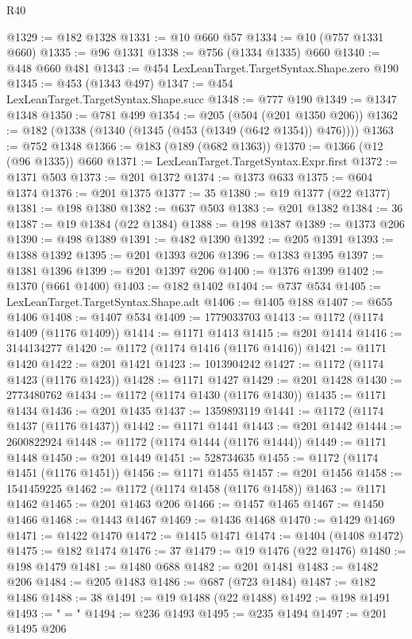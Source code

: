 \begin{lexlean}{R40}
\begin{coremodule}
@1329 := @182 @1328
@1331 := @10 @660 @57
@1334 := @10 (@757 @1331 @660)
@1335 := @96 @1331
@1338 := @756 (@1334 @1335) @660
@1340 := @448 @660 @481
@1343 := @454 LexLeanTarget.TargetSyntax.Shape.zero @190
@1345 := @453 (@1343 @497)
@1347 := @454 LexLeanTarget.TargetSyntax.Shape.succ
@1348 := @777 @190
@1349 := @1347 @1348
@1350 := @781 @499
@1354 := @205 (@504 (@201 @1350 @206))
@1362 := @182 (@1338 (@1340 (@1345 (@453 (@1349 (@642 @1354)) @476))))
@1363 := @752 @1348
@1366 := @183 (@189 (@682 @1363))
@1370 := @1366 (@12 (@96 @1335)) @660
@1371 := LexLeanTarget.TargetSyntax.Expr.first
@1372 := @1371 @503
@1373 := @201 @1372
@1374 := @1373 @633
@1375 := @604 @1374
@1376 := @201 @1375
@1377 := 35
@1380 := @19 @1377 (@22 @1377)
@1381 := @198 @1380
@1382 := @637 @503
@1383 := @201 @1382
@1384 := 36
@1387 := @19 @1384 (@22 @1384)
@1388 := @198 @1387
@1389 := @1373 @206
@1390 := @498 @1389
@1391 := @482 @1390
@1392 := @205 @1391
@1393 := @1388 @1392
@1395 := @201 @1393 @206
@1396 := @1383 @1395
@1397 := @1381 @1396
@1399 := @201 @1397 @206
@1400 := @1376 @1399
@1402 := @1370 (@661 @1400)
@1403 := @182 @1402
@1404 := @737 @534
@1405 := LexLeanTarget.TargetSyntax.Shape.adt
@1406 := @1405 @188
@1407 := @655 @1406
@1408 := @1407 @534
@1409 := 1779033703
@1413 := @1172 (@1174 @1409 (@1176 @1409))
@1414 := @1171 @1413
@1415 := @201 @1414
@1416 := 3144134277
@1420 := @1172 (@1174 @1416 (@1176 @1416))
@1421 := @1171 @1420
@1422 := @201 @1421
@1423 := 1013904242
@1427 := @1172 (@1174 @1423 (@1176 @1423))
@1428 := @1171 @1427
@1429 := @201 @1428
@1430 := 2773480762
@1434 := @1172 (@1174 @1430 (@1176 @1430))
@1435 := @1171 @1434
@1436 := @201 @1435
@1437 := 1359893119
@1441 := @1172 (@1174 @1437 (@1176 @1437))
@1442 := @1171 @1441
@1443 := @201 @1442
@1444 := 2600822924
@1448 := @1172 (@1174 @1444 (@1176 @1444))
@1449 := @1171 @1448
@1450 := @201 @1449
@1451 := 528734635
@1455 := @1172 (@1174 @1451 (@1176 @1451))
@1456 := @1171 @1455
@1457 := @201 @1456
@1458 := 1541459225
@1462 := @1172 (@1174 @1458 (@1176 @1458))
@1463 := @1171 @1462
@1465 := @201 @1463 @206
@1466 := @1457 @1465
@1467 := @1450 @1466
@1468 := @1443 @1467
@1469 := @1436 @1468
@1470 := @1429 @1469
@1471 := @1422 @1470
@1472 := @1415 @1471
@1474 := @1404 (@1408 @1472)
@1475 := @182 @1474
@1476 := 37
@1479 := @19 @1476 (@22 @1476)
@1480 := @198 @1479
@1481 := @1480 @688
@1482 := @201 @1481
@1483 := @1482 @206
@1484 := @205 @1483
@1486 := @687 (@723 @1484)
@1487 := @182 @1486
@1488 := 38
@1491 := @19 @1488 (@22 @1488)
@1492 := @198 @1491
@1493 := " = "
@1494 := @236 @1493
@1495 := @235 @1494
@1497 := @201 @1495 @206

\end{coremodule}
\end{lexlean}
